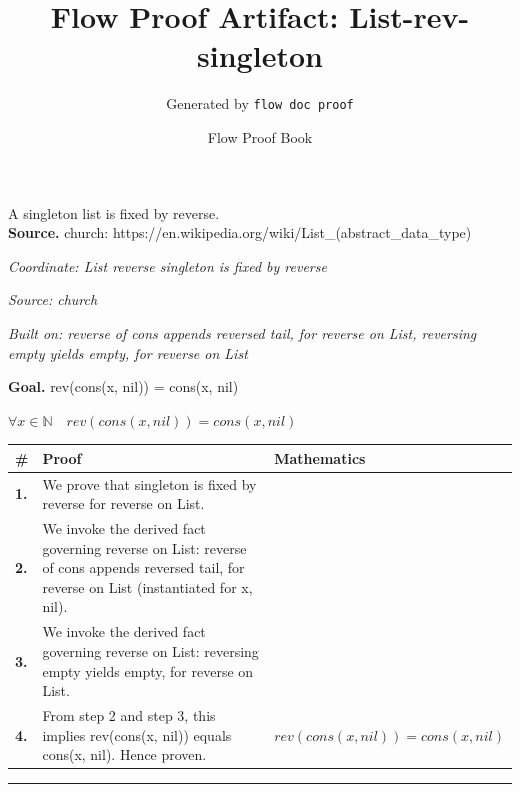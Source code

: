 \documentclass[11pt]{article}
\title{Flow Proof Artifact: List-rev-singleton}
\author{Generated by \texttt{flow doc proof}}
\date{Flow Proof Book}
\theoremstyle{definition}
\begin{document}
\maketitle
A singleton list is fixed by reverse.\\[0.5em]
\textbf{Source.} church: https://en.wikipedia.org/wiki/List\_(abstract\_data\_type)\\[0.5em]
\bigskip
{}\par
\smallskip\noindent\textit{Coordinate: List \cdot reverse \cdot singleton is fixed by reverse}\par
\smallskip\noindent\textit{Source: church}\par
\smallskip\noindent\textit{Built on: reverse of cons appends reversed tail, for reverse on List, reversing empty yields empty, for reverse on List}\par
\medskip
\noindent\textbf{Goal.} rev(cons(x, nil)) = cons(x, nil)\par
\noindent$\displaystyle \forall x \in \mathbb{N}\quad rev(cons(x, nil)) = cons(x, nil)$\par
\medskip
\noindent
\begin{tabular}{@{} >{\raggedright\arraybackslash}p{} >{\raggedright\arraybackslash}p{} >{\raggedleft\arraybackslash}p{} @{}}
\textbf{\#} & \textbf{Proof} & \textbf{Mathematics} \\
\midrule
\textbf{1.} & We prove that singleton is fixed by reverse for reverse on List. & \\[0.45em]
\textbf{2.} & We invoke the derived fact governing reverse on List: reverse of cons appends reversed tail, for reverse on List (instantiated for x, nil). & \\[0.45em]
\textbf{3.} & We invoke the derived fact governing reverse on List: reversing empty yields empty, for reverse on List. & \\[0.45em]
\textbf{4.} & From step 2 and step 3, this implies rev(cons(x, nil)) equals cons(x, nil). Hence proven. & $\displaystyle rev(cons(x, nil)) = cons(x, nil)$ \\[0.45em]
\bottomrule
\end{tabular}
\label{thm:List-reverse-singleton_is_fixed_by_reverse}
\par\medskip\hrule
\end{document}
